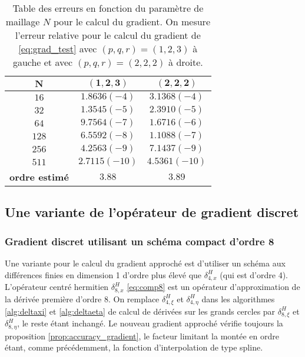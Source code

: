 \begin{table}[htbp]
\begin{center}
\begin{tabular}{|c||c|c|}
\hline
$\mathbf{N}$    & $\mathbf{(1,2,3)}$     & $\mathbf{(2,2,2)}$     \\
\hline
\hline
$16$   & $1.8636 (-4)$ & $3.1368 (-4)$ \\
$32$   & $1.3545 (-5)$ & $2.3910 (-5)$ \\
$64$   & $9.7564 (-7)$ & $1.6716 (-6)$ \\
$128$  & $6.5592 (-8)$ & $1.1088 (-7)$ \\
$256$  & $4.2563 (-9)$ & $7.1437 (-9)$ \\
$511$  & $2.7115(-10)$ & $4.5361(-10)$ \\
\hline
\hline
\textbf{ordre estimé} & $3.88$ & $3.89$ \\
\hline 
\end{tabular}
\end{center}
\caption{Table des erreurs en fonction du paramètre de maillage $N$ pour le calcul du gradient. On mesure l'erreur relative pour le calcul du gradient de \eqref{eq:grad_test} avec $(p,q,r)=(1,2,3)$ à gauche et avec $(p,q,r)=(2,2,2)$ à droite.}
\label{tab:rate_grad}
\end{table}














\subsection{Une variante de l'opérateur de gradient discret}


\subsubsection{Gradient discret utilisant un schéma compact d'ordre 8}

Une variante pour le calcul du gradient approché est d'utiliser un schéma aux différences finies en dimension 1 d'ordre plus élevé que $\delta_{4,x}^H$ (qui est d'ordre 4). 
L'opérateur centré hermitien $\delta_{8,x}^H$ \eqref{eq:comp8} est un opérateur d'approximation de la dérivée première d'ordre $8$.
On remplace $\delta_{4, \xi}^H$ et $\delta_{4, \eta}^H$ dans les algorithmes \ref{alg:deltaxi} et \ref{alg:deltaeta} de calcul de dérivées sur les grands cercles par $\delta_{8, \xi}^H$ et $\delta_{8, \eta}^H$, le reste étant inchangé. Le nouveau gradient approché vérifie toujours la proposition \ref{prop:accuracy_gradient}, le facteur limitant la montée en ordre étant, comme précédemment, la fonction d'interpolation de type spline.

